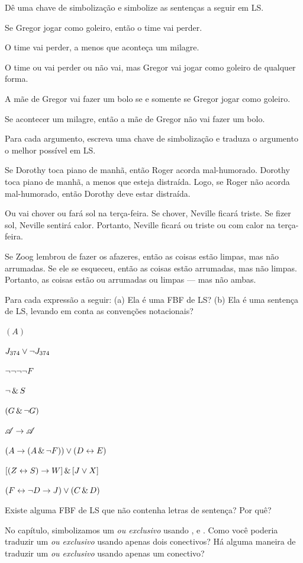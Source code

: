 \problempart Dê uma chave de simbolização e simbolize as sentenças a seguir em LS.
\begin{earg}
\item Se Gregor jogar como goleiro, então o time vai perder.
\item O time vai perder, a menos que aconteça um milagre.
\item O time ou vai perder ou não vai, mas Gregor vai jogar como goleiro de qualquer forma.
\item A mãe de Gregor vai fazer um bolo se e somente se Gregor jogar como goleiro.
\item Se acontecer um milagre, então a mãe de Gregor não vai fazer um bolo.
\end{earg}


\problempart
Para cada argumento, escreva uma chave de simbolização e traduza o argumento o melhor possível em LS.
\begin{earg}
\item Se Dorothy toca piano de manhã, então Roger acorda mal-humorado. Dorothy toca piano de manhã, a menos que esteja distraída. Logo, se Roger não acorda mal-humorado, então Dorothy deve estar distraída.
\item Ou vai chover ou fará sol na terça-feira. Se chover, Neville ficará triste. Se fizer sol, Neville sentirá calor. Portanto, Neville ficará ou triste ou com calor na terça-feira.
\item Se Zoog lembrou de fazer os afazeres, então as coisas estão limpas, mas não arrumadas. Se ele se esqueceu, então as coisas estão arrumadas, mas não limpas. Portanto, as coisas estão ou arrumadas ou limpas — mas não ambas.
\end{earg}



\solutions
\problempart
\label{pr.wiffLS}
Para cada expressão a seguir: (a) Ela é uma FBF de LS? (b) Ela é uma sentença de LS, levando em conta as convenções notacionais?
\begin{earg}
\item $(A)$
\item $J_{374} \vee \neg J_{374}$
\item $\neg \neg \neg \neg F$
\item $\neg \,\&\, S$
\item $(G \,\&\, \neg G)$
\item $\mathscr{A} \rightarrow \mathscr{A}$
\item $(A \rightarrow (A \,\&\, \neg F)) \vee (D \leftrightarrow E)$
\item $[(Z \leftrightarrow S) \rightarrow W] \,\&\, [J \vee X]$
\item $(F \leftrightarrow \neg D \rightarrow J) \vee (C \,\&\, D)$
\end{earg}



\problempart
\begin{earg}
\item Existe alguma FBF de LS que não contenha letras de sentença? Por quê?
\item No capítulo, simbolizamos um \emph{ou exclusivo} usando \eor, \eand e \enot. Como você poderia traduzir um \emph{ou exclusivo} usando apenas dois conectivos? Há alguma maneira de traduzir um \emph{ou exclusivo} usando apenas um conectivo?
\end{earg}

